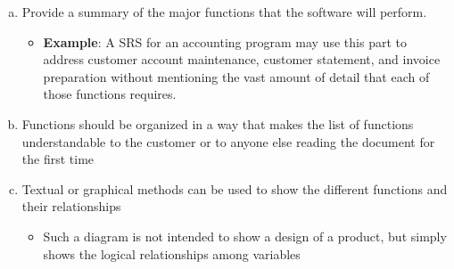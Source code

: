 \documentclass[]{article}
\begin{document}
\begin{enumerate}[a)]

	\item Provide a summary of the major functions that the software will perform. 
	\begin{itemize}
		\item \textbf{Example}: A SRS for an accounting program may use this part to address customer account maintenance, customer statement, and invoice preparation without mentioning the vast amount of detail that each of those functions requires.
	\end{itemize}
	\item Functions should be organized in a way that makes the list of functions understandable to the customer or to anyone else reading the document for the first time
	\item Textual or graphical methods can be used to show the different functions and their relationships
	\begin{itemize}
		\item Such a diagram is not intended to show a design of a product, but simply shows the logical relationships among variables
	\end{itemize} 
\end{enumerate}
\end{document}
